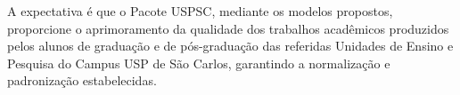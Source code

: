 	A expectativa \'e que o Pacote USPSC, mediante os modelos propostos, proporcione o aprimoramento da qualidade dos trabalhos acad\^emicos produzidos pelos alunos de gradua\c{c}\~ao e de p\'os-gradua\c{c}\~ao das referidas Unidades de Ensino e Pesquisa do Campus USP de S\~ao Carlos, garantindo a normaliza\c{c}\~ao e padroniza\c{c}\~ao estabelecidas.
	
	
